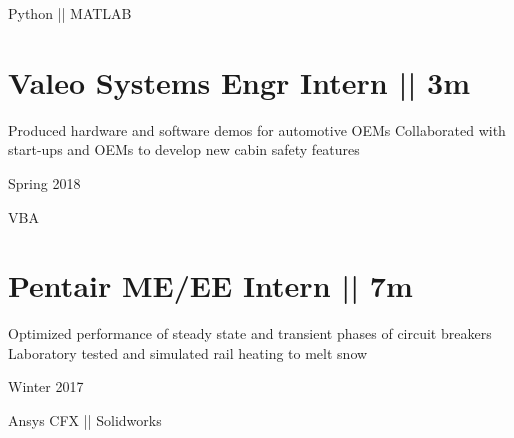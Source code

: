 \vspace{-1.5ex}
{
\vspace{1.8ex}
\color{cyan}\small
{Python || MATLAB} %
}

\vspace{0.8ex}
\section
{\textbf{Valeo}
\newline
Systems Engr Intern || 3m}

\BulletItem
\vspace{-2.5ex}
\begin{detail}
\BulletItem
 Produced hardware and software demos for automotive OEMs
\BulletItem
 Collaborated with start-ups and OEMs to develop new cabin safety features
\end{detail}

\begin{subtitle}
\vspace{-7.8ex}
{{Spring 2018}}
\end{subtitle}

\vspace{-2ex}
{
\vspace{1.8ex}
\color{cyan}\small
{VBA} %
}

\vspace{0.8ex}
\section
{\textbf{Pentair}
\newline
ME/EE Intern  || 7m}

\BulletItem
\vspace{-2.5ex}
\begin{detail}

\BulletItem
 Optimized performance of steady state and transient phases of circuit breakers
\BulletItem
 Laboratory tested and simulated rail heating to melt snow
\end{detail}

\begin{subtitle}
\vspace{-7.8ex}
{{Winter 2017}}
\end{subtitle}
\vspace{0ex}

\vspace{-1.5ex}
{
\vspace{1.8ex}
\color{cyan}\small
{Ansys CFX || Solidworks} %
}

